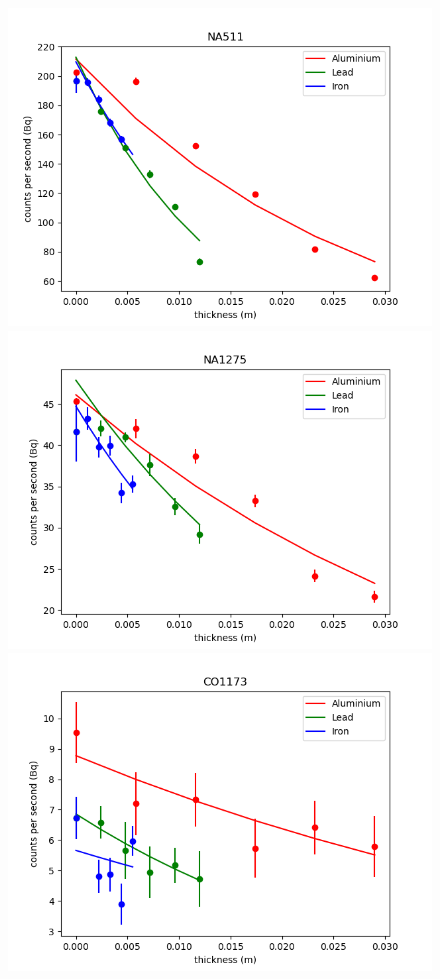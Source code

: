 \documentclass[12pt, a4paper]{article}
\begin{document}
	\begin{figure}[H] \centering
		\includegraphics[scale=0.4]{assets/NA511.png}
		\includegraphics[scale=0.4]{assets/NA1275.png}
		\includegraphics[scale=0.4]{assets/CO1173.png}

\end{figure}
\end{document}
